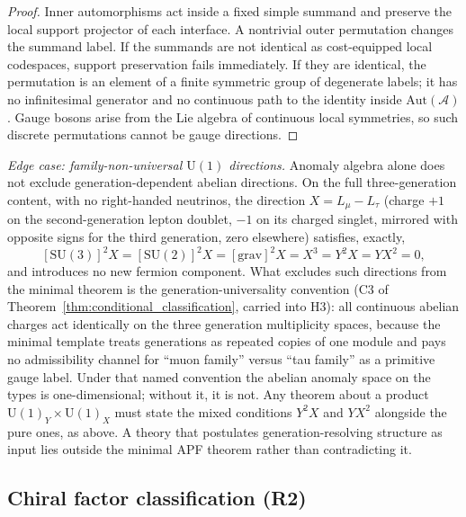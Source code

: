\documentclass[11pt]{article}
\theoremstyle{definition}
\newcommand{\SU}{\mathrm{SU}}
\newcommand{\U}{\mathrm{U}}
\begin{document}
\begin{proof}
Inner automorphisms act inside a fixed simple summand and preserve the local
support projector of each interface.  A nontrivial outer permutation changes
the summand label.  If the summands are not identical as cost-equipped local
codespaces, support preservation fails immediately.  If they are identical,
the permutation is an element of a finite symmetric group of degenerate
labels; it has no infinitesimal generator and no continuous path to the
identity inside $\mathrm{Aut}(\mathcal A)$.  Gauge bosons arise from the
Lie algebra of continuous local symmetries, so such discrete permutations
cannot be gauge directions.
\end{proof}

\smallskip\noindent\textit{Edge case: family-non-universal $\U(1)$ directions.}\quad
Anomaly algebra alone does not exclude generation-dependent abelian
directions.  On the full three-generation content, with no
right-handed neutrinos, the direction $X = L_\mu - L_\tau$ (charge
$+1$ on the second-generation lepton doublet, $-1$ on its charged
singlet, mirrored with opposite signs for the third generation, zero
elsewhere) satisfies, exactly,
\[
  [\SU(3)]^2 X = [\SU(2)]^2 X = [\mathrm{grav}]^2 X
  = X^3 = Y^2 X = Y X^2 = 0,
\]
and introduces no new fermion component.  What excludes such
directions from the minimal theorem is the generation-universality
convention (C3 of Theorem~\ref{thm:conditional_classification},
carried into H3): all continuous abelian charges act identically on
the three generation multiplicity spaces, because the minimal template
treats generations as repeated copies of one module and pays no
admissibility channel for ``muon family'' versus ``tau family'' as a
primitive gauge label.  Under that named convention the abelian
anomaly space on the types is one-dimensional; without it, it is not.
Any theorem about a product $\U(1)_Y \times \U(1)_X$ must state the
mixed conditions $Y^2 X$ and $Y X^2$ alongside the pure ones, as
above.  A theory that postulates generation-resolving structure as
input lies outside the minimal APF theorem rather than contradicting
it.

\subsection{Chiral factor classification (R2)}
\label{sec:R2_classification}
\end{document}
